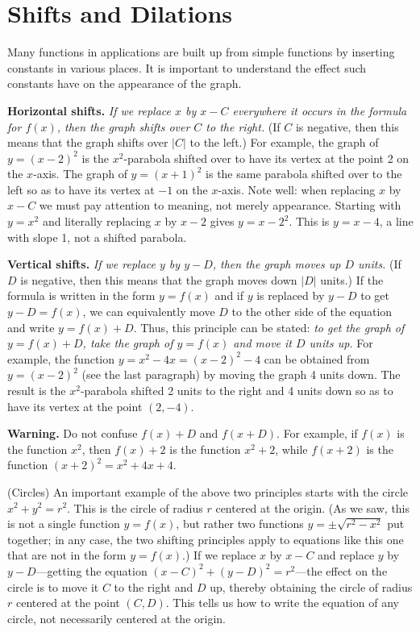 \section{Shifts and Dilations}{}{}

Many functions in applications are built up from simple functions by
inserting constants in various places.  It is important to understand
the effect such constants have on the appearance of the graph.

\ssk\noindent
{\bf Horizontal shifts.} {\it If we replace $x$ by $x-C$ everywhere it
occurs in the formula for $f(x)$, then the graph shifts over $C$ to the
right.} (If $C$ is negative, then this means that the graph shifts over
$|C|$ to the left.)  For example, the graph of $y=(x-2)^2$ is the
$x^2$-parabola shifted over to have its vertex at the point 2 on the
$x$-axis.  The graph of $y=(x+1)^2$ is the same parabola shifted over to
the left so as to have its vertex at $-1$ on the $x$-axis. Note well:
when replacing $x$ by $x-C$ we must pay attention to meaning, not
merely appearance. Starting with $y=x^2$ and literally replacing $x$
by $x-2$ gives $y=x-2^2$. This is $y=x-4$, a line with slope 1, not a
shifted parabola.

\ssk\noindent
{\bf Vertical shifts.} {\it If we replace $y$ by $y-D$, then the graph
moves up $D$ units.}  (If $D$ is negative, then this means that the graph
moves down $|D|$ units.)  If the formula is written in the form
$y=f(x)$ and if $y$ is replaced by $y-D$ to get $y-D=f(x)$, we can
equivalently move $D$ to the other side of the equation and write
$y=f(x)+D$.  Thus, this principle can be stated: {\it to get the
graph of $y=f(x)+D$, take the graph of $y=f(x)$ and move it $D$ units up.}
For example, the function $y=x^2-4x=(x-2)^2-4$ can be obtained from
$y=(x-2)^2$ (see the last paragraph) by moving the graph 4 units down.
The result is the $x^2$-parabola shifted 2 units to the right and 4 units
down so as to have its vertex at the point $(2,-4)$.

\ssk\noindent
{\bf Warning.}  Do not confuse $f(x)+D$ and $f(x+D)$.  For example,
if $f(x)$ is the function $x^2$, then $f(x)+2$ is the function $x^2+2$,
while $f(x+2)$ is the function $(x+2)^2=x^2+4x+4$.

\begin{example} (Circles) An important example of the above two principles
starts with the circle $x^2+y^2=r^2$.  This is the circle of radius
$r$ centered at the origin.  (As we saw, this is not a single function
$y=f(x)$, but rather two functions $y=\pm\sqrt{r^2-x^2}$ put together;
in any case, the two shifting principles apply to equations like this
one that are not in the form $y=f(x)$.)  If we replace $x$
by $x-C$ and replace $y$ by $y-D$---getting the equation
$(x-C)^2+(y-D)^2=r^2$---the effect on the circle is to move it $C$ to
the right and $D$ up, thereby obtaining the circle of radius $r$
centered at the point $(C,D)$.  This tells us how to write the
equation of any circle, not necessarily centered at the origin.
\end{example}

